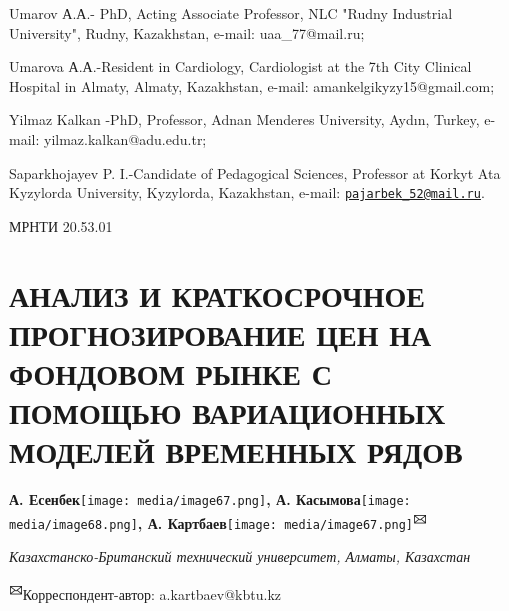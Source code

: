 \documentclass[
]{article}
\begin{document}
Umarov А.А.- PhD, Acting Associate Professor, NLC "Rudny Industrial
University", Rudny, Kazakhstan, e-mail: uaa\_77@mail.ru;

Umarova А.А.-Resident in Cardiology, Cardiologist at the 7th City
Clinical Hospital in Almaty, Almaty, Kazakhstan, e-mail:
amankelgikyzy15@gmail.com;

Yilmaz Kalkan -PhD, Professor, Adnan Menderes University, Aydın, Turkey,
e-mail: yilmaz.kalkan@adu.edu.tr;

Saparkhojayev P. I.-Candidate of Pedagogical Sciences, Professor at
Korkyt Ata Kyzylorda University, Kyzylorda, Kazakhstan, e-mail:
\href{mailto:pajarbek_52@mail.ru}{\nolinkurl{pajarbek\_52@mail.ru}}.

МРНТИ 20.53.01

\section{\texorpdfstring{\textbf{АНАЛИЗ И КРАТКОСРОЧНОЕ ПРОГНОЗИРОВАНИЕ
ЦЕН НА ФОНДОВОМ РЫНКЕ С ПОМОЩЬЮ ВАРИАЦИОННЫХ МОДЕЛЕЙ ВРЕМЕННЫХ
РЯДОВ}}{АНАЛИЗ И КРАТКОСРОЧНОЕ ПРОГНОЗИРОВАНИЕ ЦЕН НА ФОНДОВОМ РЫНКЕ С ПОМОЩЬЮ ВАРИАЦИОННЫХ МОДЕЛЕЙ ВРЕМЕННЫХ РЯДОВ}}\label{ux430ux43dux430ux43bux438ux437-ux438-ux43aux440ux430ux442ux43aux43eux441ux440ux43eux447ux43dux43eux435-ux43fux440ux43eux433ux43dux43eux437ux438ux440ux43eux432ux430ux43dux438ux435-ux446ux435ux43d-ux43dux430-ux444ux43eux43dux434ux43eux432ux43eux43c-ux440ux44bux43dux43aux435-ux441-ux43fux43eux43cux43eux449ux44cux44e-ux432ux430ux440ux438ux430ux446ux438ux43eux43dux43dux44bux445-ux43cux43eux434ux435ux43bux435ux439-ux432ux440ux435ux43cux435ux43dux43dux44bux445-ux440ux44fux434ux43eux432}

\textbf{А.
Есенбек}\texttt{[image: media/image67.png]}\textbf{,
А.
Касымова}\texttt{[image: media/image68.png]}\textbf{,
А.
Картбаев}\texttt{[image: media/image67.png]}\textbf{\textsuperscript{🖂}}

\emph{Казахстанско-Британский технический университет, Алматы,
Казахстан}

\textbf{\textsuperscript{🖂}}Корреспондент-автор: a.kartbaev@kbtu.kz
\end{document}
